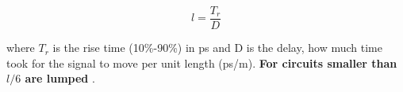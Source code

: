 \documentclass[final]{cubedoc}
\begin{document}
	\[l = \frac{T_r}{D}\]
	
	where $T_r$ is the rise time (10\%-90\%) in ps and D is the delay, how much time took for the signal to move per unit length (ps/m).\textbf{ For circuits smaller than $l/6$ are lumped} \cite{johnson2003high}.
	
	
	
	
	
	
	
	
	
	
\end{document}

